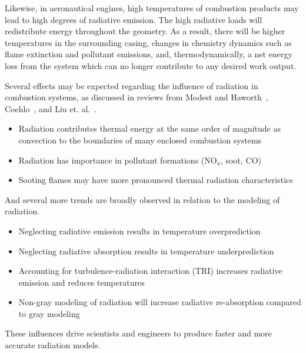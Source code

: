 Likewise, in aeronautical engines, high temperatures of combustion products may lead to high degrees of radiative emission.
The high radiative loads will redistribute energy throughout the geometry. As a result, there will be higher temperatures in the surrounding casing, changes in chemistry dynamics such as flame extinction and pollutant emissions, and, thermodynamically, a net energy loss from the system which can no longer contribute to any desired work output.

Several effects may be expected regarding the influence of radiation in combustion systems, as discussed in reviews from Modest and Haworth~\cite{Modest2016RadiativeSystems}, Coehlo~\cite{Coelho2018RadiativeSystems}, and Liu et. al.~\cite{Liu2020TheFlames}.
\begin{itemize}
    \item Radiation contributes thermal energy at the same order of magnitude as convection to the boundaries of many enclosed combustion systems~\cite{Gamil2020AssessmentChamber,Johnson2021AnalysisMethod}
    \item Radiation has importance in pollutant formations (NO${}_x$, soot, CO)~\cite{Ihme2008ModelingFormulation,Habibi2007TurbulenceFlames}
    \item Sooting flames may have more pronounced thermal radiation characteristics
\end{itemize}
And several more trends are broadly observed in relation to the modeling of radiation.
\begin{itemize}
    \item Neglecting radiative emission results in temperature overprediction~\cite{Gamil2020AssessmentChamber}
    \item Neglecting radiative absorption results in temperature underprediction
    \item Accounting for turbulence-radiation interaction (TRI) increases radiative emission and reduces temperatures
    \item Non-gray modeling of radiation will increase radiative re-absorption compared to gray modeling~\cite{Wu2021LimitationsFires}
\end{itemize}

These influences drive scientists and engineers to produce faster and more accurate radiation models.






